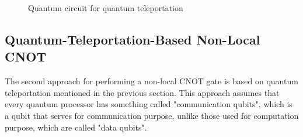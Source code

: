 \begin{figure}[ht]
  	\begin{center}
	\caption{Quantum circuit for quantum teleportation}
	\end{center}
\end{figure}

\subsection{Quantum-Teleportation-Based Non-Local CNOT}

 The second approach for performing a non-local CNOT gate is based on quantum teleportation mentioned in the previous section.  This approach assumes that every quantum processor has something called "communication qubits", which is a qubit that serves for communication purpose, unlike those used for computation purpose, which are called "data qubits".
 
